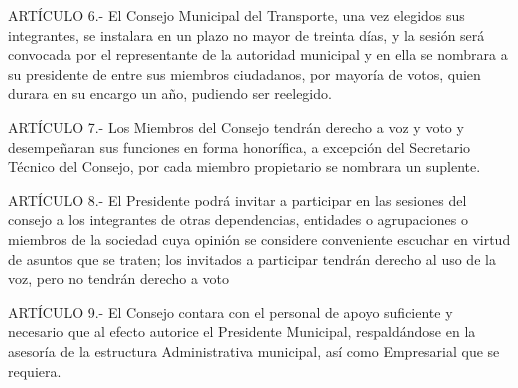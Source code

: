 \documentclass{bmcart}
\begin{document}
ARTÍCULO 6.- El Consejo Municipal del Transporte, una vez elegidos sus integrantes, se instalara en un plazo no mayor de treinta días, y la sesión será convocada por el representante de la autoridad municipal y en ella se nombrara a su presidente de entre sus miembros ciudadanos, por mayoría de votos, quien durara en su encargo un año, pudiendo ser reelegido.

ARTÍCULO 7.- Los Miembros del Consejo tendrán derecho a voz y voto y desempeñaran sus funciones en forma honorífica, a excepción del Secretario Técnico del Consejo, por cada miembro propietario se nombrara un suplente.

ARTÍCULO 8.- El Presidente podrá invitar a participar en las sesiones del consejo a los integrantes de otras dependencias, entidades o agrupaciones o miembros de la sociedad cuya opinión se considere conveniente escuchar en virtud de asuntos que se traten; los invitados a participar tendrán derecho al uso de la voz, pero no tendrán derecho a voto

ARTÍCULO 9.- El Consejo contara con el personal de apoyo suficiente y necesario que al efecto autorice el Presidente Municipal, respaldándose en la asesoría de la estructura Administrativa municipal, así como Empresarial que se requiera.
\end{document}
